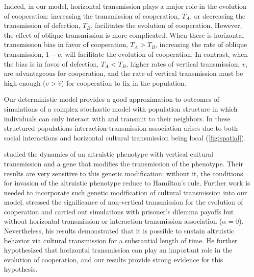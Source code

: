 \documentclass[12pt]{extarticle}
\begin{document}
Indeed, in our model, horizontal transmission plays a major role in the evolution of cooperation: increasing the transmission of cooperation, $T_A$, or decreasing the transmission of defection, $T_B$, facilitates the evolution of cooperation. 
However, the effect of oblique transmission is more complicated.
When there is horizontal transmission bias in favor of cooperation, $T_A>T_B$, increasing the rate of oblique transmission, $1-v$, will facilitate the evolution of cooperation.
In contrast, when the bias is in favor of defection, $T_A<T_B$, higher rates of vertical transmission, $v$, are advantageous for cooperation, and the rate of vertical transmission must be high enough ($v>\hat v$) for cooperation to fix in the population.

Our deterministic model provides a good approximation to outcomes of simulations of a complex stochastic model with population structure in which individuals can only interact with and transmit to their neighbors.
In these structured populations interaction-transmission association arises due to both social interactions and horizontal cultural transmission being local (\autoref{fig:spatial}).

\citet{feldman1985gene} studied the dynamics of an altruistic phenotype with vertical cultural transmission and a gene that modifies the transmission of the phenotype. Their results are very sensitive to this genetic modification: without it, the conditions for invasion of the altruistic phenotype reduce to Hamilton's rule.
Further work is needed to incorporate such genetic modification of cultural transmission into our model.
\citet{woodcock2006significance} stressed the significance of non-vertical transmission for the evolution of cooperation and
carried out simulations with prisoner's dilemma payoffs but without horizontal transmission or interaction-transmission association ($\alpha=0$).
Nevertheless, his results demonstrated that it is possible to sustain altruistic behavior via cultural transmission for a substantial length of time.
He further hypothesized that horizontal transmission can play an important role in the evolution of cooperation, and our results provide strong evidence for this hypothesis. 
\end{document}
